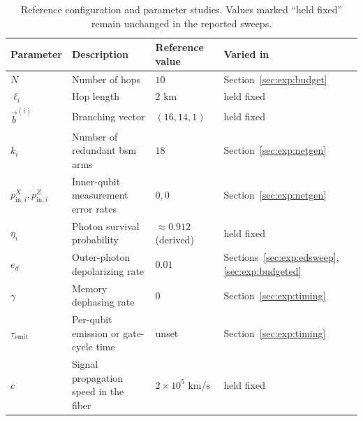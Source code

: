 \begin{table}[ht]
    \centering
    \caption{Reference configuration and parameter studies. Values marked ``held fixed'' remain unchanged in the reported sweeps.}
    \label{tab:model:reference-config}
    \small
    \begin{tabular}{llll}
        \hline
        Parameter & Description & Reference value & Varied in \\
        \hline
        $N$ & Number of hops & $10$ & Section~\ref{sec:exp:budget} \\
        $\ell_i$ & Hop length & $2\text{ km}$ & held fixed \\
        $\vec{b}^{(i)}$ & Branching vector & $(16,14,1)$ & held fixed \\
        $k_i$ & Number of redundant \Gls{bsm} arms & $18$ & Section~\ref{sec:exp:netgen} \\
        $p_{\mathrm{in},i}^{X},p_{\mathrm{in},i}^{Z}$ & Inner-qubit measurement error rates & $0,0$ & Section~\ref{sec:exp:netgen} \\
        $\eta_i$ & Photon survival probability & $\approx0.912$ (derived) & held fixed \\
        $e_d$ & Outer-photon depolarizing rate & $0.01$ & Sections~\ref{sec:exp:edsweep}, \ref{sec:exp:budgeted} \\
        $\gamma$ & Memory dephasing rate & $0$ & Section~\ref{sec:exp:timing} \\
        $\tau_{\mathrm{emit}}$ & Per-qubit emission or gate-cycle time & unset & Section~\ref{sec:exp:timing} \\
        $c$ & Signal propagation speed in the fiber & $2\times10^5\text{ km/s}$ & held fixed \\
        \hline
    \end{tabular}
\end{table}